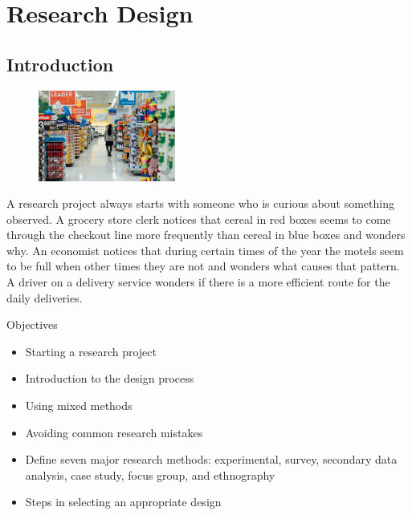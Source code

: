\chapter{Research Design}\label{04:design}

\section{Introduction}

\begin{figure}
	\label{02:fig01} 
	\centering
	\includegraphics[width=0.4\textwidth]{gfx/04-store} 
\end{figure}
A research project always starts with someone who is curious about something observed. A grocery store clerk notices that cereal in red boxes seems to come through the checkout line more frequently than cereal in blue boxes and wonders why. An economist notices that during certain times of the year the motels seem to be full when other times they are not and wonders what causes that pattern. A driver on a delivery service wonders if there is a more efficient route for the daily deliveries.

\begin{center}
	\begin{objbox}{Objectives}
		\begin{itemize}
			\setlength{\itemsep}{0pt}
			\setlength{\parskip}{0pt}
			\setlength{\parsep}{0pt}
			
			\item Starting a research project
			\item Introduction to the design process
			\item Using mixed methods
			\item Avoiding common research mistakes
			\item Define seven major research methods: experimental, survey, secondary data analysis, case study, focus group, and ethnography
			\item Steps in selecting an appropriate design
		\end{itemize}
	\end{objbox}
\end{center}

